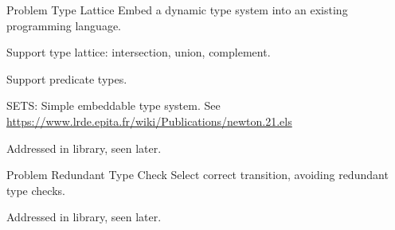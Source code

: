 \begin{frame}{Problem }{Type Lattice}
  Embed a dynamic type system into an existing programming language.

  \medskip
  
  Support type lattice: intersection, union, complement.

  \medskip
  
  Support predicate types.

  \medskip  

  SETS: Simple embeddable type system.
  See \url{https://www.lrde.epita.fr/wiki/Publications/newton.21.els}

  \medskip
  
  Addressed in  library, seen later.
\end{frame}


\begin{frame}{Problem }{Redundant Type Check}
  Select correct transition, avoiding redundant type checks.

  \medskip

  \scalebox{0.85}{}

  \medskip
  
  Addressed in  library, seen later.
\end{frame}

